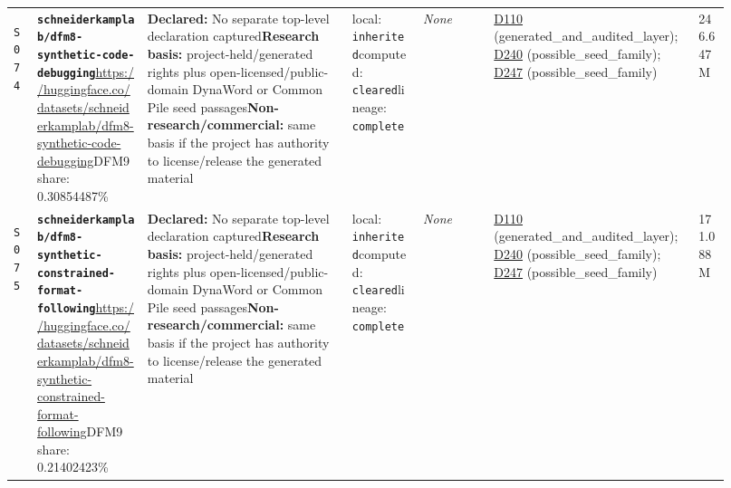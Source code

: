 \documentclass[9pt,a4paper]{article}
\newcommand{\srcid}[1]{\hypertarget{src:#1}{\texttt{#1}}}
\begin{document}
\begin{landscape}
\begin{longtable}{@{}L{0.03\linewidth}L{0.14\linewidth}L{0.26\linewidth}L{0.09\linewidth}L{0.09\linewidth}L{0.265\linewidth}L{0.045\linewidth}@{}}
\srcid{S074} & \textbf{\nolinkurl{schneiderkamplab/dfm8-synthetic-code-debugging}}\newline \url{https://huggingface.co/datasets/schneiderkamplab/dfm8-synthetic-code-debugging}\newline DFM9 share: 0.30854487\% & \textbf{Declared:} No separate top-level declaration captured\newline \textbf{Research basis:} project-held/generated rights plus open-licensed/public-domain DynaWord or Common Pile seed passages\newline \textbf{Non-research/commercial:} same basis if the project has authority to license/release the generated material & local: \texttt{inherited}\newline computed: \texttt{cleared}\newline lineage: \texttt{complete} & \textit{None} & \hyperlink{dep:D110}{D110} (generated\_and\_audited\_layer); \hyperlink{dep:D240}{D240} (possible\_seed\_family); \hyperlink{dep:D247}{D247} (possible\_seed\_family) & 246.647M \\
\srcid{S075} & \textbf{\nolinkurl{schneiderkamplab/dfm8-synthetic-constrained-format-following}}\newline \url{https://huggingface.co/datasets/schneiderkamplab/dfm8-synthetic-constrained-format-following}\newline DFM9 share: 0.21402423\% & \textbf{Declared:} No separate top-level declaration captured\newline \textbf{Research basis:} project-held/generated rights plus open-licensed/public-domain DynaWord or Common Pile seed passages\newline \textbf{Non-research/commercial:} same basis if the project has authority to license/release the generated material & local: \texttt{inherited}\newline computed: \texttt{cleared}\newline lineage: \texttt{complete} & \textit{None} & \hyperlink{dep:D110}{D110} (generated\_and\_audited\_layer); \hyperlink{dep:D240}{D240} (possible\_seed\_family); \hyperlink{dep:D247}{D247} (possible\_seed\_family) & 171.088M \\

\end{longtable}
\end{landscape}
\end{document}
